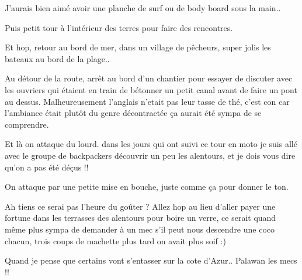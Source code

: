 \begin{multicols}{2}

J'aurais bien aimé avoir une planche de surf ou de body board sous la main..


Puis petit tour à l'intérieur des terres pour faire des rencontres.


Et hop, retour au bord de mer, dans un village de pêcheurs, super jolis les bateaux au bord de la plage..


Au détour de la route, arrêt au bord d'un chantier pour essayer de discuter avec les ouvriers qui étaient en train de bétonner un petit canal avant de faire un pont au dessus. Malheureusement l'anglais n'etait pas leur tasse de thé, c'est con car l'ambiance était plutôt du genre décontractée ça aurait été sympa de se comprendre.


Et là on attaque du lourd. dans les jours qui ont suivi ce tour en moto je suis allé avec le groupe de backpackers découvrir un peu les alentours, et je dois vous dire qu'on a pas été déçus !!

On attaque par une petite mise en bouche, juste comme ça pour donner le ton.


Ah tiens ce serai pas l'heure du goûter ? Allez hop au lieu d'aller payer une fortune dans les terrasses des alentours pour boire un verre, ce serait quand même plus sympa de demander à un mec s'il peut nous descendre une coco chacun, trois coups de machette plus tard on avait plus soif :)


Quand je pense que certains vont s'entasser sur la cote d'Azur.. Palawan les mecs !!


\end{multicols}
